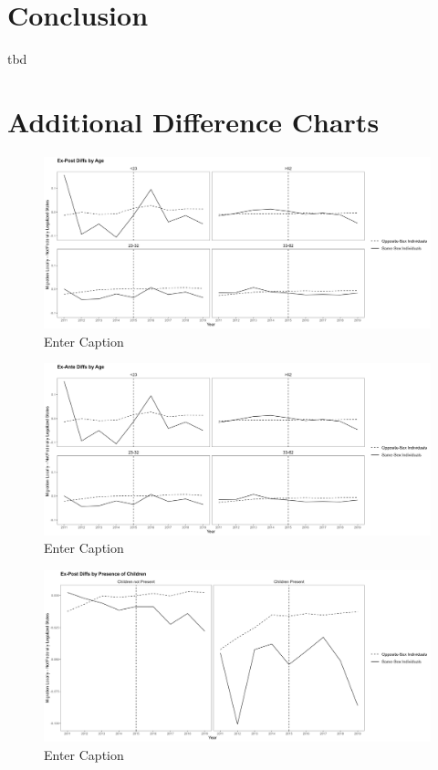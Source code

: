 \documentclass[12pt,letterpaper]{article}
\begin{document}
\begin{landscape}
\begin{tiny}


\end{tiny}
\end{landscape}

\section{Conclusion}
tbd



\newpage



\appendix
\section{Additional Difference Charts}

\begin{figure}
    \centering
    \includegraphics[width=0.75\linewidth]{outputs/summary_stats/age_post_diffs.png}
    \caption{Enter Caption}
    \label{fig:enter-label}
\end{figure}

\begin{figure}
    \centering
    \includegraphics[width=0.75\linewidth]{outputs/summary_stats/age_ante_diffs.png}
    \caption{Enter Caption}
    \label{fig:enter-label}
\end{figure}


\begin{figure}
    \centering
    \includegraphics[width=0.75\linewidth]{outputs/summary_stats/child_post_diffs.png}
    \caption{Enter Caption}
    \label{fig:enter-label}
\end{figure}
\end{document}
